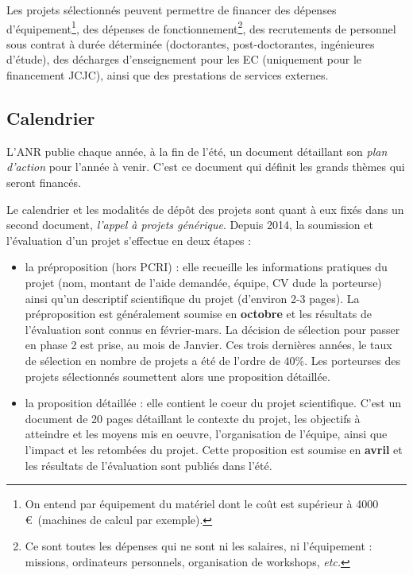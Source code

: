 Les projets s\'electionn\'es peuvent permettre de financer des d\'epenses d'\'equipement\footnote{On entend par \'equipement du mat\'eriel dont le co\^ut est sup\'erieur \`a 4000\,\euro~(machines de calcul par exemple).}, des d\'epenses de fonctionnement\footnote{Ce sont toutes les d\'epenses qui ne sont ni les salaires, ni l'\'equipement : missions, ordinateurs personnels, organisation de workshops, {\em etc.}}, des recrutements de personnel sous contrat \`a dur\'ee d\'etermin\'ee (doctorant\mp e\mp s, post-doctorant\mp e\mp s, ing\'enieur\mp e\mp s
d'\'etude), des d\'echarges d'enseignement pour les EC (uniquement pour le financement JCJC), ainsi que des prestations de services externes.

\subsection{Calendrier}

L'ANR publie chaque ann\'ee, \`a la fin de l'\'et\'e, un document d\'etaillant son {\em plan d'action} pour l'ann\'ee \`a venir. C'est ce document qui d\'efinit les grands th\`emes qui seront financ\'es.

Le calendrier et les modalit\'es de d\'ep\^ot des projets sont quant \`a eux fix\'es dans un second document, {\em l'appel \`a projets g\'en\'erique}. Depuis 2014, la soumission et l'\'evaluation d'un projet s'effectue en deux \'etapes :
\begin{itemize}
\item la pr\'eproposition (hors PCRI) : elle recueille les informations pratiques du projet (nom, montant de l'aide demand\'ee, \'equipe, CV du\mp de la porteur\mp se) ainsi qu'un descriptif scientifique du projet (d'environ 2-3 pages). La pr\'eproposition est g\'en\'eralement soumise en {\bf octobre} et les r\'esultats de l'\'evaluation sont connus en f\'evrier-mars. La d\'ecision de s\'election pour passer en phase 2 est prise, au mois de Janvier. Ces trois derni\`eres ann\'ees, le taux de s\'election en nombre de projets a \'et\'e de l'ordre de 40\%. Les porteur\mp ses des projets s\'electionn\'es soumettent alors une proposition d\'etaill\'ee. 
\item la proposition d\'etaill\'ee : elle contient le coeur du projet scientifique. C'est un document de 20 pages d\'etaillant le contexte du projet, les objectifs \`a atteindre et les moyens mis en oeuvre, l'organisation de l'\'equipe, ainsi que l'impact et les retomb\'ees du projet. Cette proposition est soumise en {\bf avril} et les r\'esultats de l'\'evaluation sont publi\'es dans l'\'et\'e.
\end{itemize}

